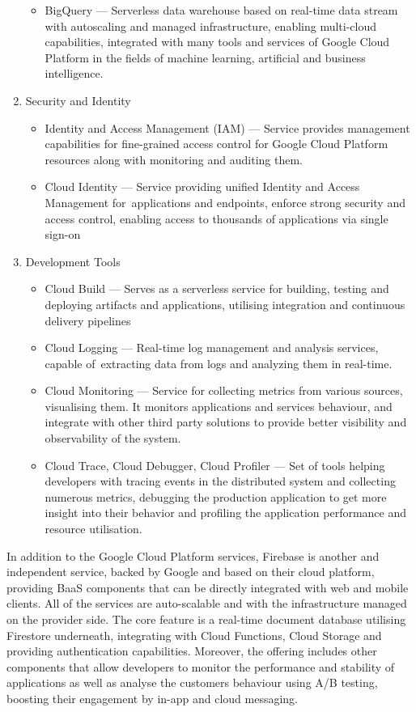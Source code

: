\begin{enumerate}
\begin{itemize}
       \item BigQuery --- Serverless data warehouse based on real-time data stream with autoscaling and managed infrastructure, enabling multi-cloud capabilities, integrated with many tools and services of Google Cloud Platform in the fields of machine learning, artificial and business intelligence.
   \end{itemize}
   \item Security and Identity
   \begin{itemize}
       \item Identity and Access Management (IAM) --- Service provides management capabilities for fine-grained access control for Google Cloud Platform resources along with monitoring and auditing them.
       \item Cloud Identity --- Service providing unified Identity and Access Management for~applications and endpoints, enforce strong security and access control, enabling access to thousands of applications via single sign-on
   \end{itemize}
   \item Development Tools
   \begin{itemize}
       \item Cloud Build --- Serves as a serverless service for building, testing and deploying artifacts and applications, utilising integration and continuous delivery pipelines
       \item Cloud Logging --- Real-time log management and analysis services, capable of~extracting data from logs and analyzing them in real-time.
       \item Cloud Monitoring --- Service for collecting metrics from various sources, visualising them. It monitors applications and services behaviour, and integrate with other third party solutions to provide better visibility and observability of the system.
       \item Cloud Trace, Cloud Debugger, Cloud Profiler --- Set of tools helping developers with tracing events in the distributed system and collecting numerous metrics, debugging the production application to get more insight into their behavior and profiling the application performance and resource utilisation.
   \end{itemize}
\end{enumerate}

In addition to the Google Cloud Platform services, Firebase \cite{Firebase} is another and independent service, backed by Google and based on their cloud platform, providing BaaS components that can be directly integrated with web and mobile clients. All of the services are auto-scalable and with the infrastructure managed on the provider side. The core feature is a real-time document database utilising Firestore underneath, integrating with Cloud Functions, Cloud Storage and providing authentication capabilities. Moreover, the offering includes other components that allow developers to monitor the performance and stability of applications as well as analyse the customers behaviour using A/B testing, boosting their engagement by in-app and cloud messaging.

